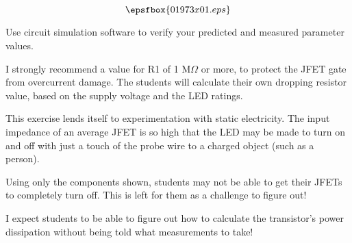 

$$\epsfbox{01973x01.eps}$$

\vfil \eject






Use circuit simulation software to verify your predicted and measured parameter values.







I strongly recommend a value for R1 of 1 M$\Omega$ or more, to protect the JFET gate from overcurrent damage.  The students will calculate their own dropping resistor value, based on the supply voltage and the LED ratings.

This exercise lends itself to experimentation with static electricity.  The input impedance of an average JFET is so high that the LED may be made to turn on and off with just a touch of the probe wire to a charged object (such as a person).

Using only the components shown, students may not be able to get their JFETs to completely turn off.  This is left for them as a challenge to figure out!

I expect students to be able to figure out how to calculate the transistor's power dissipation without being told what measurements to take!




